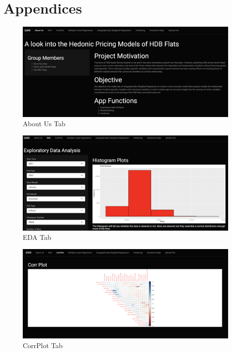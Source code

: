 \documentclass[manuscript,screen]{acmart}
\begin{document}
\hypertarget{appendices}{%
\section{Appendices}\label{appendices}}

\begin{figure}

{\centering \includegraphics{images/Screenshot 2023-04-14 at 11.08.12 PM.png}

}

\caption{\label{fig-1}About Us Tab}

\end{figure}

\begin{figure}

{\centering \includegraphics{images/Screenshot 2023-04-14 at 11.34.06 PM.png}

}

\caption{\label{fig-2}EDA Tab}

\end{figure}

\begin{figure}

{\centering \includegraphics{images/Screenshot 2023-04-14 at 11.41.50 PM.png}

}

\caption{\label{fig-3}CorrPlot Tab}

\end{figure}
\end{document}
